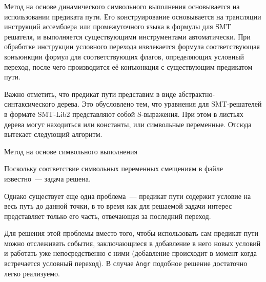 Метод на основе динамического символьного выполнения основывается на использовании предиката пути.
Его конструирование основывается на трансляции инструкций ассемблера или промежуточного языка в формулы для SMT решателя, и выполняется существующими инструментами автоматически.
При обработке инструкции условного перехода извлекается формула соответствующая конъюнкции формул для соответствующих флагов, определяющих условный переход, после чего производится её конъюнкция с существующим предикатом пути.

Важно отметить, что предикат пути представим в виде абстрактно-синтаксического дерева. Это обусловлено тем, что уравнения для SMT-решателей в формате SMT-Lib2 представляют собой S-выражения. При этом в листьях дерева могут находиться или константы, или символьные переменные. Отсюда вытекает следующий алгоритм.
\bigskip

\begin{algorithm}[H]
\SetAlgoLined
{}
  \caption{Метод на основе символьного выполнения}
\end{algorithm}

\bigskip
Поскольку соответствие символьных переменных смещениям в файле известно~--- задача решена.

Однако существует еще одна проблема~--- предикат пути содержит условие на весь путь до данной точки, в то время как для решаемой задачи интерес представляет только его часть, отвечающая за последний переход.


Для решения этой проблемы вместо того, чтобы использовать сам предикат пути можно отслеживать события, заключающиеся в добавление в него новых условий и работать уже непосредственно с ними (добавление происходит в момент когда встречается условный переход). В случае \texttt{Angr} подобное решение достаточно легко реализуемо.

